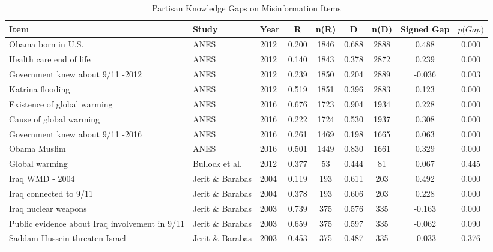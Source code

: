 \begin{table}[!htb]
\centering
\caption{Partisan Knowledge Gaps on Misinformation Items} 
\label{tab:misinfo_items}
\begingroup\tiny
\begin{tabular}{lllcccccc}
  \hline
Item & Study & Year & R & n(R) & D & n(D) & Signed Gap & $\textit{p(Gap)}$ \\ 
  \hline
Obama born in U.S. & ANES & 2012 & 0.200 & 1846 & 0.688 & 2888 & 0.488 & 0.000 \\ 
  Health care end of life & ANES & 2012 & 0.140 & 1843 & 0.378 & 2872 & 0.239 & 0.000 \\ 
  Government knew about 9/11 -2012 & ANES & 2012 & 0.239 & 1850 & 0.204 & 2889 & -0.036 & 0.003 \\ 
  Katrina flooding & ANES & 2012 & 0.519 & 1851 & 0.396 & 2883 & 0.123 & 0.000 \\ 
  Existence of global warming & ANES & 2016 & 0.676 & 1723 & 0.904 & 1934 & 0.228 & 0.000 \\ 
  Cause of global warming & ANES & 2016 & 0.222 & 1724 & 0.530 & 1937 & 0.308 & 0.000 \\ 
  Government knew about 9/11 -2016 & ANES & 2016 & 0.261 & 1469 & 0.198 & 1665 & 0.063 & 0.000 \\ 
  Obama Muslim & ANES & 2016 & 0.501 & 1449 & 0.830 & 1661 & 0.329 & 0.000 \\ 
  Global warming & Bullock et al. & 2012 & 0.377 &   53 & 0.444 &   81 & 0.067 & 0.445 \\ 
  Iraq WMD - 2004 & Jerit \& Barabas & 2004 & 0.119 &  193 & 0.611 &  203 & 0.492 & 0.000 \\ 
  Iraq connected to 9/11 & Jerit \& Barabas & 2004 & 0.378 &  193 & 0.606 &  203 & 0.228 & 0.000 \\ 
  Iraq nuclear weapons & Jerit \& Barabas & 2003 & 0.739 &  375 & 0.576 &  335 & -0.163 & 0.000 \\ 
  Public evidence about Iraq involvement in 9/11 & Jerit \& Barabas & 2003 & 0.659 &  375 & 0.597 &  335 & -0.062 & 0.090 \\ 
  Saddam Hussein threaten Israel & Jerit \& Barabas & 2003 & 0.453 &  375 & 0.487 &  335 & -0.033 & 0.376 \\ 
   \hline
\end{tabular}
\endgroup
\end{table}
